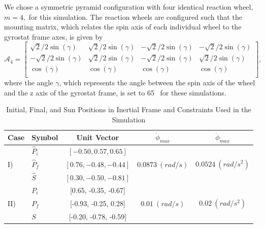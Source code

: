 \documentclass[journal ]{new-aiaa}
\begin{document}
We chose a symmetric pyramid configuration with four identical reaction wheel, $m=4,$ for this simulation. The reaction wheels are configured such that the mounting matrix, which relates the spin axis of each individual wheel to the gyrostat frame axes, is given by
\begin{equation}\label{mounting1}
\mathcal{A}_4=\begin{bmatrix}
\sqrt{2}/2\sin(\gamma)&\sqrt{2}/2\sin(\gamma)&-\sqrt{2}/2\sin(\gamma)&-\sqrt{2}/2\sin(\gamma)\\
-\sqrt{2}/2\sin(\gamma)&\sqrt{2}/2\sin(\gamma)&-\sqrt{2}/2\sin(\gamma)&\sqrt{2}/2\sin(\gamma)\\
\cos(\gamma)&\cos(\gamma)&\cos(\gamma)&\cos(\gamma)\\

\end{bmatrix},
\end{equation}
where the angle $\gamma$, which represents the angle between the spin axis of the wheel and the z axis of the gyrostat frame, is set to 65\textdegree~ for these simulations. 

\begin{table}[hbt!]
\centering
\caption{Initial, Final, and Sun Positions in Inertial Frame and Constraints Used in the Simulation}
\begin{tabular}{llccc}
\hline
Case&Symbol& Unit Vector & $\dot{\phi}_{max}$&$\ddot{\phi}_{max}$ \\
\hline
&$\hat{P}_i$ & $[-0.50, 0.57, 0.65]$& & \\
I)& $\hat{P}_f$ & $[0.76, -0.48, -0.44]$& $0.0873\ (rad/s)$& $0.0524\ (rad/s^2)$\\ 
&$\hat{S}$ & $[0.30, -0.50, -0.81]$& & \\
\hline
&$P_i$ & [0.65, -0.35, -0.67] & &\\
II)&$P_f$ & [-0.93, -0.25, 0.28] & $0.01\ (rad/s)$& $0.02\ (rad/s^2)$\\ 
&$S$ & [-0.20, -0.78, -0.59] & &\\
\hline
\end{tabular}
\label{tab:alphaNot0_PiPfS_AWmax}%
\end{table}	
\end{document}
